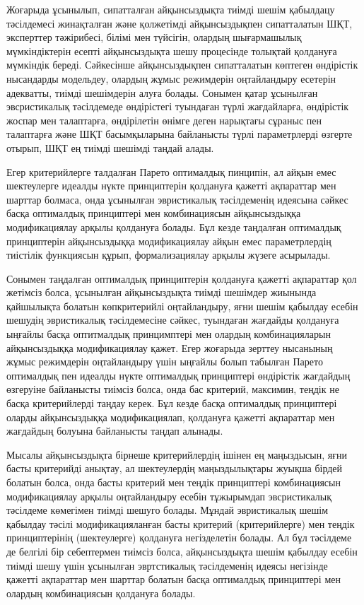 \begin{multicols}{2}
Жоғарыда ұсынылып, сипатталған айқынсыздықта тиімді шешім қабылдацу
тәсілдемесі жинақталған және қолжетімді айқынсыздықпен сипатталатын ШҚТ,
эксперттер тәжірибесі, білімі мен түйсігін, олардың шығармашылық
мүмкіндіктерін есепті айқынсыздықта шешу процесінде толықтай қолдануға
мүмкіндік береді. Сәйкесінше айқынсыздықпен сипатталатын көптеген
өндірістік нысандарды модельдеу, олардың жұмыс режимдерін оңтайландыру
есетерін адекватты, тиімді шешімдерін алуға болады. Сонымен қатар
ұсынылған эвсристикалық тәсілдемеде өндірістегі туындаған түрлі
жағдайларға, өндірістік жоспар мен талаптарға, өндірілетін өнімге деген
нарықтағы сұраныс пен талаптарға және ШҚТ басымқыларына байланысты түрлі
параметрлерді өзгерте отырып, ШҚТ ең тиімді шешімді таңдай алады.

Егер критерийлерге талдалған Парето оптималдық пинципін, ал айқын емес
шектеулерге идеалды нүкте принциптерін қолдануға қажетті ақпараттар мен
шарттар болмаса, онда ұсынылған эвристикалық тәсілдеменің идеясына
сәйкес басқа оптималдық принциптері мен комбинациясын айқынсыздыққа
модификациялау арқылы қолдануға болады. Бұл кезде таңдалған оптималдық
принциптерін айқынсыздыққа модификациялау айқын емес параметрлердің
тиістілік функциясын құрып, формализациялау арқылы жүзеге асырылады.

Сонымен таңдалған оптималдық принциптерін қолдануға қажетті ақпараттар
қол жетімсіз болса, ұсынылған айқынсыздықта тиімді шешімдер жиынында
қайшылықта болатын көпкритерийлі оңтайландыру, яғни шешім қабылдау
есебін шешудің эвристикалық тәсілдемесіне сәйкес, туындаған жағдайды
қолдануға ыңғайлы басқа оптитмалдық принцимптері мен олардың
комбинацияларын айқынсыздыққа модификациялау қажет. Егер жоғарыда
зерттеу нысанының жұмыс режимдерін оңтайландыру үшін ыңғайлы болып
табылған Парето оптималдық пен идеалды нүкте оптималдық принциптері
өндірістік жағдайдың өзгеруіне байланысты тиімсіз болса, онда бас
критерий, максимин, теңдік не басқа критерийлерді таңдау керек. Бұл
кезде басқа оптималдық принциптері оларды айқынсыздыққа модификациялап,
қолдануға қажетті ақпараттар мен жағдайдың болуына байланысты таңдап
алынады.

Мысалы айқынсыздықта бірнеше критерийлердің ішінен ең маңыздысын, яғни
басты критерийді анықтау, ал шектеулердің маңыздылықтары жуықша бірдей
болатын болса, онда басты критерий мен теңдік принциптері комбинациясын
модификациялау арқылы оңтайландыру есебін тұжырымдап эвсристикалық
тәсілдеме көмегімен тиімді шешуго болады. Мұндай эвристикалық шешім
қабылдау тәсілі модификацияланған басты критерий (критерийлерге) мен
теңдік принциптерінің (шектеулерге) қолдануға негізделетін болады. Ал
бұл тәсілдеме де белгілі бір себептермен тиімсіз болса, айқынсыздықта
шешім қабылдау есебін тиімді шешу үшін ұсынылған эвртстикалық
тәсілдеменің идеясы негізінде қажетті ақпараттар мен шарттар болатын
басқа оптималдық принциптері мен олардың комбинациясын қолдануға болады.


\end{multicols}
